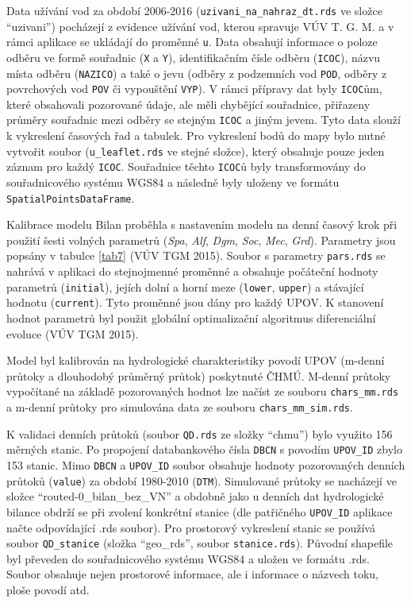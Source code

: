 \documentclass[12pt,]{article}
\begin{document}
\qquad Data užívání vod za období 2006-2016
(\texttt{uzivani\_na\_nahraz\_dt.rds} ve složce \enquote{uzivani})
pocházejí z evidence užívání vod, kterou spravuje VÚV T. G. M. a v rámci
aplikace se ukládají do proměnné \texttt{u}. Data obsahují informace o
poloze odběru ve formě souřadnic (\texttt{X} a \texttt{Y}),
identifikačním čísle odběru (\texttt{ICOC}), názvu místa odběru
(\texttt{NAZICO}) a také o jevu (odběry z podzemních vod \texttt{POD},
odběry z povrchových vod \texttt{POV} či vypouštění \texttt{VYP}). V
rámci přípravy dat byly \texttt{ICOC}ům, které obsahovali pozorované
údaje, ale měli chybějící souřadnice, přiřazeny průměry souřadnic mezi
odběry se stejným \texttt{ICOC} a jiným jevem. Tyto data slouží k
vykreslení časových řad a tabulek. Pro vykreslení bodů do mapy bylo
nutné vytvořit soubor (\texttt{u\_leaflet.rds} ve stejné složce), který
obsahuje pouze jeden záznam pro každý \texttt{ICOC}. Souřadnice těchto
\texttt{ICOC}ů byly transformovány do souřadnicového systému WGS84 a
následně byly uloženy ve formátu \texttt{SpatialPointsDataFrame}.

\qquad Kalibrace modelu Bilan proběhla s nastavením modelu na denní
časový krok při použití šesti volných parametrů (\emph{Spa}, \emph{Alf},
\emph{Dgm}, \emph{Soc}, \emph{Mec}, \emph{Grd}). Parametry jsou popsány
v tabulce \ref{tab7} (VÚV TGM 2015). Soubor s parametry
\texttt{pars.rds} se nahrává v aplikaci do stejnojmenné proměnné a
obsahuje počáteční hodnoty parametrů (\texttt{initial}), jejích dolní a
horní meze (\texttt{lower}, \texttt{upper}) a stávající hodnotu
(\texttt{current}). Tyto proměnné jsou dány pro každý UPOV. K stanovení
hodnot parametrů byl použit globální optimalizační algoritmus
diferenciální evoluce (VÚV TGM 2015).

\qquad Model byl kalibrován na hydrologické charakteristiky povodí UPOV
(m-denní průtoky a dlouhodobý průměrný průtok) poskytnuté ČHMÚ. M-denní
průtoky vypočítané na základě pozorovaných hodnot lze načíst ze souboru
\texttt{chars\_mm.rds} a m-denní průtoky pro simulována data ze souboru
\texttt{chars\_mm\_sim.rds}.

\qquad K validaci denních průtoků (soubor \texttt{QD.rds} ze složky
\enquote{chmu}) bylo využito 156 měrných stanic. Po propojení
databankového čísla \texttt{DBCN} s povodím \texttt{UPOV\_ID} zbylo 153
stanic. Mimo \texttt{DBCN} a \texttt{UPOV\_ID} soubor obsahuje hodnoty
pozorovaných denních průtoků (\texttt{value}) za období 1980-2010
(\texttt{DTM}). Simulované průtoky se nacházejí ve složce
\enquote{routed-0\_bilan\_bez\_VN} a obdobně jako u denních dat
hydrologické bilance obdrží se při zvolení konkrétní stanice (dle
patřičného \texttt{UPOV\_ID} aplikace načte odpovídající .rds soubor).
Pro prostorový vykreslení stanic se používá soubor \texttt{QD\_stanice}
(složka \enquote{geo\_rds}, soubor \texttt{stanice.rds}). Původní
shapefile byl převeden do souřadnicového systému WGS84 a uložen ve
formátu .rds. Soubor obsahuje nejen prostorové informace, ale i
informace o názvech toku, ploše povodí atd.
\end{document}
